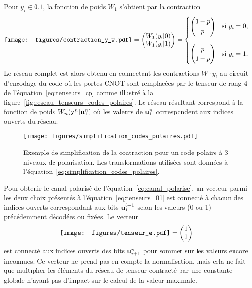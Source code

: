 Pour $y_i \in \qty{0, 1}$,
la fonction de poids $W_1$ s'obtient par la contraction
\begin{equation}
  \vcenter{\hbox{\texttt{[image: figures/contraction\_y\_w.pdf]}}}
  =
  \begin{pmatrix}
    W_1(y_i | 0) \\
    W_1(y_i | 1)
  \end{pmatrix}
  =
  \begin{cases}
    \begin{pmatrix}1 - p\\p\end{pmatrix} & \text{si } y_i = 0, \\[0.7cm]
    \begin{pmatrix}p\\1-p\end{pmatrix} & \text{si } y_i = 1.
  \end{cases}
\end{equation}
Le réseau complet est alors obtenu en connectant les contractions $W \cdot y_i$
au circuit d'encodage du code où les portes CNOT sont remplacées par le tenseur 
de rang 4 de l'équation~\eqref{eq:tenseurs_cp} comme illustré à la 
figure~\ref{fig:reseau_tenseurs_codes_polaires}.
Le réseau résultant correspond à la fonction de poids $W_n(\vb y_1^n | \vb u_1^n)$
où les valeurs de $\vb u_1^n$ correspondent aux indices ouverts du réseau.

\begin{figure}
  \begin{center}
    \texttt{[image: figures/simplification\_codes\_polaires.pdf]}
  \end{center}
  \caption[Exemple de simplification de la contraction d'un code polaire]{
    Exemple de simplification de la contraction pour un code polaire à 3 niveaux de polarisation.
    Les transformations utilisées sont données à l'équation~\eqref{eq:simplification_codes_polaires}.
  }
  \label{fig:simplification_codes_polaires}
\end{figure}

Pour obtenir le canal polarisé de l'équation~\ref{eq:canal_polarise},
un vecteur parmi les deux choix présentés à l'équation~\ref{eq:tenseurs_01}
est connecté à chacun des indices ouverts correspondant aux bits $\vb u_1^{i-1}$
selon les valeurs (0 ou 1) précédemment décodées ou fixées.
Le vecteur 
\begin{equation}
  \vcenter{\hbox{\texttt{[image: figures/tenseur\_e.pdf]}}}
  =\begin{pmatrix}1\\1\end{pmatrix}
\end{equation}
est connecté aux indices ouverts des bits $\vb u_{i+1}^{n}$ pour sommer
sur les valeurs encore inconnues.
Ce vecteur ne prend pas en compte la normalisation,
mais cela ne fait que multiplier les éléments du réseau de tenseur
contracté par une constante globale n'ayant pas d'impact sur le calcul de
la valeur maximale.

